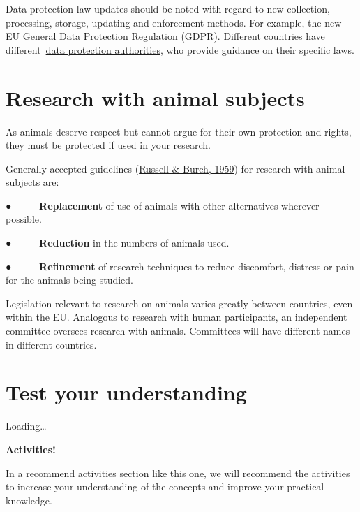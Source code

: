 \documentclass[
]{book}
\begin{document}
Data protection law updates should be noted with regard to new collection, processing, storage, updating and enforcement methods. For example, the new EU General Data Protection Regulation (\href{https://gdpr.eu/what-is-gdpr/}{GDPR}). Different countries have different~\href{https://en.wikipedia.org/wiki/National_data_protection_authority}{}\href{https://en.wikipedia.org/wiki/National_data_protection_authority}{data protection authorities}, who provide guidance on their specific laws.

\hypertarget{research-with-animal-subjects}{%
\section{\texorpdfstring{\textbf{Research with animal subjects}}{Research with animal subjects}}\label{research-with-animal-subjects}}

As animals deserve respect but cannot argue for their own protection and rights, they must be protected if used in your research.

Generally accepted guidelines (\href{http://117.239.25.194:7000/jspui/bitstream/123456789/1342/1/PRILIMINERY\%20\%20AND\%20\%20CONTENTS.pdf}{Russell \& Burch, 1959}) for research with animal subjects are:

● ~ ~ ~ \textbf{Replacement} of use of animals with other alternatives wherever possible.

● ~ ~ ~ \textbf{Reduction} in the numbers of animals used.

● ~ ~ ~ \textbf{Refinement} of research techniques to reduce discomfort, distress or pain for the animals being studied.

Legislation relevant to research on animals varies greatly between countries, even within the EU. Analogous to research with human participants, an independent committee oversees research with animals. Committees will have different names in different countries.

\hypertarget{test-your-understanding-7}{%
\section{Test your understanding}\label{test-your-understanding-7}}

Loading\ldots{}

\textbf{Activities!}

In a recommend activities section like this one, we will recommend the activities to increase your understanding of the concepts and improve your practical knowledge.
\end{document}
